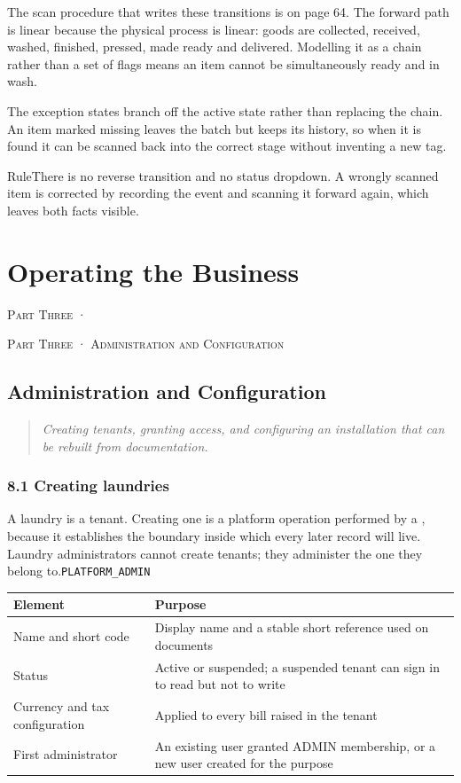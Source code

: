 \documentclass[11pt,a4paper,oneside]{book}
\begin{document}
The scan procedure that writes these transitions is on page 64. The forward path is linear because the physical process is linear: goods are collected, received, washed, finished, pressed, made ready and delivered. Modelling it as a chain rather than a set of flags means an item cannot be simultaneously ready and in wash.

The exception states branch off the active state rather than replacing the chain. An item marked missing leaves the batch but keeps its history, so when it is found it can be scanned back into the correct stage without inventing a new tag.

\begin{notebox}RuleThere is no reverse transition and no status dropdown. A wrongly scanned item is corrected by recording the event and scanning it forward again, which leaves both facts visible.\end{notebox}
\part{Operating the Business}
\textsc{\small\color{crimson}Part Three ·}\par\medskip
\textsc{\small\color{crimson}Part Three · Administration and Configuration}\par\medskip
\chapter{Administration and Configuration}
\begin{quote}\itshape Creating tenants, granting access, and configuring an installation that can be rebuilt from documentation.\end{quote}
\section{8.1 Creating laundries}
A laundry is a tenant. Creating one is a platform operation performed by a , because it establishes the boundary inside which every later record will live. Laundry administrators cannot create tenants; they administer the one they belong to.\texttt{PLATFORM\_ADMIN}

\begin{center}\small
\begin{tabularx}{\linewidth}{|X|X|}
\hline
\rowcolor{lightgrey}
\textbf{Element} & \textbf{Purpose} \\ \hline
Name and short code & Display name and a stable short reference used on documents \\ \hline
Status & Active or suspended; a suspended tenant can sign in to read but not to write \\ \hline
Currency and tax configuration & Applied to every bill raised in the tenant \\ \hline
First administrator & An existing user granted ADMIN membership, or a new user created for the purpose \\ \hline
\end{tabularx}
\end{center}
\end{document}
